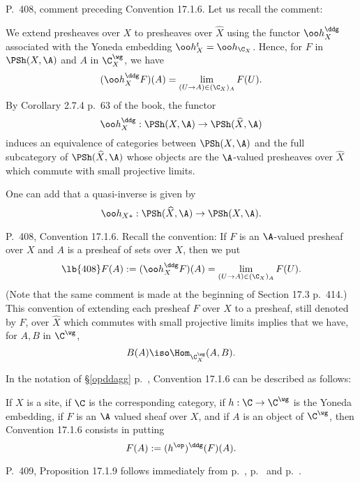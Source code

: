 \documentclass[12pt]{article}
\theoremstyle{remark}
\theoremstyle{definition}
\begin{document}
%

\begin{s}
P.~408, comment preceding Convention 17.1.6. Let us recall the comment: 

We extend presheaves over $X$ to presheaves over $\widehat X$ using the functor $\oo h_X^\ddg$ associated with the Yoneda embedding $\oo h_X^t=\oo h_{\C_X}$. Hence, for $F$ in $\PSh(X,\A)$ and $A$ in $\C_X^\wg$, we have 
$$
(\oo h_X^\ddg F)(A)=\lim_{(U\to A)\in(\C_X)_A}F(U).
$$ 
By Corollary 2.7.4 p.~63 of the book, the functor 
$$
\oo h_X^\ddg:\PSh(X,\A)\to\PSh(\widehat X,\A)
$$ 
induces an equivalence of categories between $\PSh(X,\A)$ and the full subcategory of $\PSh(\widehat X,\A)$ whose objects are the $\A$-valued presheaves over $\widehat X$ which commute with small projective limits. 

One can add that a quasi-inverse is given by 
$$
\oo h_{X*}:\PSh(\widehat X,\A)\to\PSh(X,\A). 
$$ 
\end{s}

%

\begin{s}
P.~408, Convention 17.1.6. Recall the convention: If $F$ is an $\A$-valued presheaf over $X$ and $A$ is a presheaf of sets over $X$, then we put 
%
\begin{equation}\lb{408}
F(A):=(\oo h_X^\ddg F)(A)=\lim_{(U\to A)\in(\C_X)_A}F(U).
\end{equation}
% 
(Note that the same comment is made at the beginning of Section 17.3 p.~414.) This convention of extending each presheaf $F$ over $X$ to a presheaf, still denoted by $F$, over $\widehat X$ which commutes with small projective limits implies that we have, for $A,B$ in $\C^\wg$, 
$$
B(A)\iso\Hom_{\C_X^\wg}(A,B).
$$ 

In the notation of \S\ref{opddagg} p.~, Convention 17.1.6 can be described as follows:

If $X$ is a site, if $\C$ is the corresponding category, if $h:\C\to\C^\wg$ is the Yoneda embedding, if $F$ is an $\A$ valued sheaf over $X$, and if $A$ is an object of $\C^\wg$, then Convention 17.1.6 consists in putting 
$$
F(A):=(h^{\op})^\ddg(F)(A).
$$ 
\end{s}

%

\begin{s}
P.~409, Proposition 17.1.9 follows immediately from  p.~,  p.~ and  p.~.
\end{s}
\end{document}
